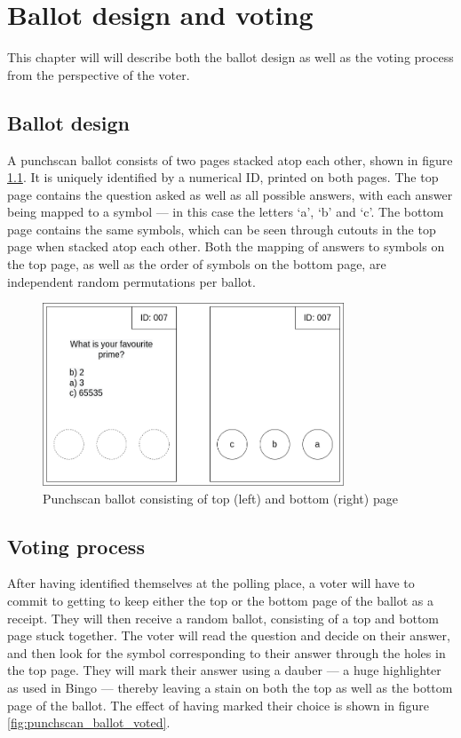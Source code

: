 \chapter{Ballot design and voting}

This chapter will will describe both the ballot design as well as the voting
process from the perspective of the voter.

\section{Ballot design}

A punchscan ballot consists of two pages stacked atop each other, shown in
figure \ref{fig:punchscan_ballot}. It is uniquely identified by a numerical ID,
printed on both pages. The top page contains the question asked as well as all
possible answers, with each answer being mapped to a symbol --- in this case
the letters `a', `b' and `c'. The bottom page contains the same symbols, which
can be seen through cutouts in the top page when stacked atop each other. Both
the mapping of answers to symbols on the top page, as well as the order of
symbols on the bottom page, are independent random permutations per ballot.

\begin{figure}
\centering
\includegraphics[width=0.8\textwidth]{../resources/high_level_ballot.drawio}
\caption{Punchscan ballot consisting of top (left) and bottom (right) page}
\label{fig:punchscan_ballot}
\end{figure}

\section{Voting process}

After having identified themselves at the polling place, a voter will have to
commit to getting to keep either the top or the bottom page of the ballot as a
receipt. They will then receive a random ballot, consisting of a top and bottom
page stuck together. The voter will read the question and decide on their
answer, and then look for the symbol corresponding to their answer through the
holes in the top page. They will mark their answer using a dauber --- a huge
highlighter as used in Bingo --- thereby leaving a stain on both the top as
well as the bottom page of the ballot. The effect of having marked their choice
is shown in figure \ref{fig:punchscan_ballot_voted}.

